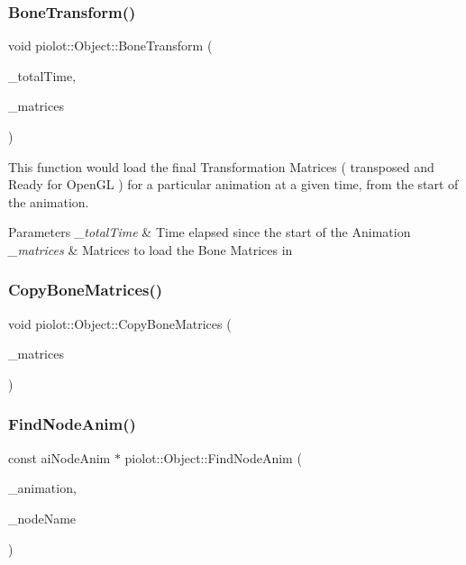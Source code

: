 \subsubsection{\texorpdfstring{Bone\+Transform()}{BoneTransform()}}
{\footnotesize\ttfamily void piolot\+::\+Object\+::\+Bone\+Transform (\begin{DoxyParamCaption}\item[{float}]{\+\_\+total\+Time,  }\item[{std\+::vector$<$ glm\+::mat4 $>$ \&}]{\+\_\+matrices }\end{DoxyParamCaption})}



This function would load the final Transformation Matrices ( transposed and Ready for Open\+GL ) for a particular animation at a given time, from the start of the animation. 


\begin{DoxyParams}{Parameters}
{\em \+\_\+total\+Time} & Time elapsed since the start of the Animation \\
\hline
{\em \+\_\+matrices} & Matrices to load the Bone Matrices in \\
\hline
\end{DoxyParams}
\mbox{\label{classpiolot_1_1_object_ae4fa72eb5f53481b0daf2d99decec169}} 
\subsubsection{\texorpdfstring{Copy\+Bone\+Matrices()}{CopyBoneMatrices()}}
{\footnotesize\ttfamily void piolot\+::\+Object\+::\+Copy\+Bone\+Matrices (\begin{DoxyParamCaption}\item[{std\+::vector$<$ glm\+::mat4 $>$ \&}]{\+\_\+matrices }\end{DoxyParamCaption})}

\mbox{\label{classpiolot_1_1_object_a63011b95040a4fab1f2514258c70b35a}} 
\subsubsection{\texorpdfstring{Find\+Node\+Anim()}{FindNodeAnim()}}
{\footnotesize\ttfamily const ai\+Node\+Anim $\ast$ piolot\+::\+Object\+::\+Find\+Node\+Anim (\begin{DoxyParamCaption}\item[{const ai\+Animation $\ast$}]{\+\_\+animation,  }\item[{const std\+::string \&}]{\+\_\+node\+Name }\end{DoxyParamCaption})\hspace{0.3cm}{\ttfamily [private]}}



